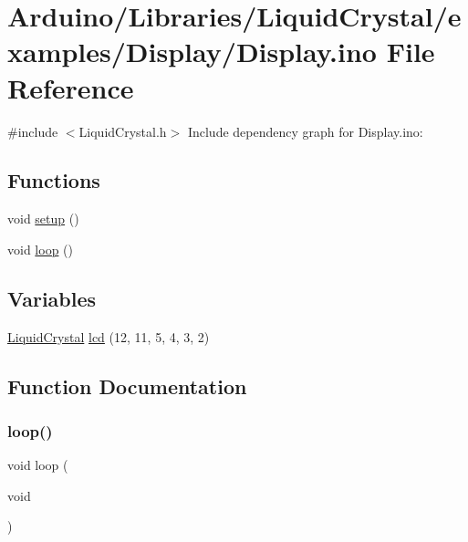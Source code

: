 \hypertarget{_display_8ino}{}\section{Arduino/\+Libraries/\+Liquid\+Crystal/examples/\+Display/\+Display.ino File Reference}
\label{_display_8ino}
{\ttfamily \#include $<$Liquid\+Crystal.\+h$>$}\newline
Include dependency graph for Display.\+ino\+:
\subsection*{Functions}
\begin{DoxyCompactItemize}
\item 
void \hyperlink{_display_8ino_a4fc01d736fe50cf5b977f755b675f11d}{setup} ()
\item 
void \hyperlink{_display_8ino_afe461d27b9c48d5921c00d521181f12f}{loop} ()
\end{DoxyCompactItemize}
\subsection*{Variables}
\begin{DoxyCompactItemize}
\item 
\hyperlink{class_liquid_crystal}{Liquid\+Crystal} \hyperlink{_display_8ino_a7226623e632d4109904c86009c9f3b60}{lcd} (12, 11, 5, 4, 3, 2)
\end{DoxyCompactItemize}


\subsection{Function Documentation}
\mbox{\label{_display_8ino_afe461d27b9c48d5921c00d521181f12f}} 
\subsubsection{\texorpdfstring{loop()}{loop()}}
{\footnotesize\ttfamily void loop (\begin{DoxyParamCaption}\item[{void}]{ }\end{DoxyParamCaption})}

